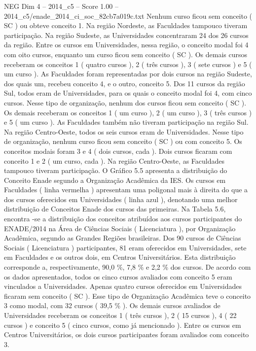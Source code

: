 \begin{textsample}{NEG Dim 4 – 2014\_c5 – Score 1.00 – 2014\_c5/enade\_2014\_ci\_soc\_82cb7a019c.txt}
Nenhum curso ficou sem conceito ( SC ) ou obteve conceito 1.
Na região Nordeste, as Faculdades tampouco tiveram participação.
Na região Sudeste, as Universidades concentraram 24 dos 26 cursos da região.
Entre os cursos em Universidades, nessa região, o conceito modal foi 4 com oito cursos, enquanto um curso ficou sem conceito ( SC ).
Os demais cursos receberam os conceitos 1 ( quatro cursos ), 2 ( três cursos ), 3 ( sete cursos ) e 5 ( um curso ).
As Faculdades foram representadas por dois cursos na região Sudeste, dos quais um, recebeu conceito 4, e o outro, conceito 5.
Dos 11 cursos da região Sul, todos eram de Universidades, para os quais o conceito modal foi 4, com cinco cursos.
Nesse tipo de organização, nenhum dos cursos ficou sem conceito ( SC ).
Os demais receberam os conceitos 1 ( um curso ), 2 ( um curso ), 3 ( três cursos ) e 5 ( um curso ).
As Faculdades também não tiveram participação na região Sul.
Na região Centro-Oeste, todos os seis cursos eram de Universidades.
Nesse tipo de organização, nenhum curso ficou sem conceito ( SC ) ou com conceito 5.
Os conceitos modais foram 3 e 4 ( dois cursos, cada ).
Dois cursos ficaram com conceito 1 e 2 ( um curso, cada ).
Na região Centro-Oeste, as Faculdades tampouco tiveram participação.
O Gráfico 5.5 apresenta a distribuição do Conceito Enade segundo a Organização Acadêmica da IES.
Os cursos em Faculdades ( linha vermelha ) apresentam uma poligonal mais à direita do que a dos cursos oferecidos em Universidades ( linha azul ), denotando uma melhor distribuição de Conceitos Enade dos cursos das primeiras.
Na Tabela 5.6, encontra -se a distribuição dos conceitos atribuídos aos cursos participantes do ENADE/2014 na Área de Ciências Sociais ( Licenciatura ), por Organização Acadêmica, segundo as Grandes Regiões brasileiras.
Dos 90 cursos de Ciências Sociais ( Licenciatura ) participantes, 81 eram oferecidos em Universidades, sete em Faculdades e os outros dois, em Centros Universitários.
Esta distribuição corresponde a, respectivamente, 90,0 \%, 7,8 \% e 2,2 \% dos cursos.
De acordo com os dados apresentados, todos os cinco cursos avaliados com conceito 5 eram vinculados a Universidades.
Apenas quatro cursos oferecidos em Universidades ficaram sem conceito ( SC ).
Esse tipo de Organização Acadêmica teve o conceito 3 como modal, com 32 cursos ( 39,5 \% ).
Os demais cursos avaliados de Universidades receberam os conceitos 1 ( três cursos ), 2 ( 15 cursos ), 4 ( 22 cursos ) e conceito 5 ( cinco cursos, como já mencionado ).
Entre os cursos em Centros Universitários, os dois cursos participantes foram avaliados com conceito 3.

\end{textsample}
